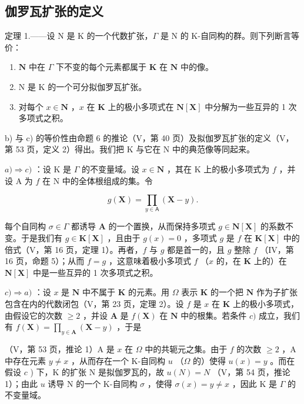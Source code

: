 \subsection{伽罗瓦扩张的定义}

定理 1.——设 N 是 K 的一个代数扩张，\(\Gamma\) 是 N 的 K-自同构的群。则下列断言等价：

\begin{enumerate}
\def\labelenumi{\alph{enumi})}
\item
  \(\mathbf{N}\) 中在 \(\Gamma\) 下不变的每个元素都属于 \(\mathbf{K}\) 在 \(\mathbf{N}\) 中的像。
\item
  N 是 K 的一个可分拟伽罗瓦扩张。
\item
  对每个 \(x \in \mathbf{N}\) ，\(x\) 在 \(\mathbf{K}\) 上的极小多项式在 \(\mathbf{N}[\mathbf{X}]\) 中分解为一些互异的 1 次多项式之积。
\end{enumerate}

b) 与 c) 的等价性由命题 6 的推论（V，第 40 页）及拟伽罗瓦扩张的定义（V，第 53 页，定义 2）得出。我们把 K 与它在 N 中的典范像等同起来。

\(a) \Rightarrow c)\) ：设 K 是 \(\Gamma\) 的不变量域。设 \(x \in \mathbf{N}\) ，其在 K 上的极小多项式为 \(f\) ，并设 A 为 \(f\) 在 N 中的全体根组成的集。令

\[
g (\mathbf {X}) = \prod_ {y \in \mathsf {A}} (\mathbf {X} - y).
\]

每个自同构 \(\sigma \in \Gamma\) 都诱导 \(\mathbf{A}\) 的一个置换，从而保持多项式 \(g \in \mathbf{N}[\mathbf{X}]\) 的系数不变。于是我们有 \(g \in \mathbf{K}[\mathbf{X}]\) ，且由于 \(g(x) = 0\) ，多项式 \(g\) 是 \(f\) 在 \(\mathbf{K}[\mathbf{X}]\) 中的倍式（V，第 16 页，定理 1）。再者，\(f\) 与 \(g\) 都是首一的，且 \(g\) 整除 \(f\) （IV，第 16 页，命题 5）；从而 \(f = g\) ，这意味着极小多项式 \(f\) （\(x\) 的，在 \(\mathbf{K}\) 上的）在 \(\mathbf{N}[\mathbf{X}]\) 中是一些互异的 1 次多项式之积。

\(c) \Rightarrow a)\) ：设 \(x\) 是 \(\mathbf{N}\) 中不属于 \(\mathbf{K}\) 的元素。用 \(\Omega\) 表示 \(\mathbf{K}\) 的一个把 \(\mathbf{N}\) 作为子扩张包含在内的代数闭包（V，第 23 页，定理 2）。设 \(f\) 是 \(x\) 在 \(\mathbf{K}\) 上的极小多项式，由假设它的次数 \(\geqslant 2\) ，并设 \(\mathbf{A}\) 是 \(f(\mathbf{X})\) 在 \(\mathbf{N}\) 中的根集。若条件 \(c)\) 成立，我们有 \(f(\mathbf{X}) = \prod_{y \in \mathbf{A}} (\mathbf{X} - y)\) ，于是

（V，第 53 页，推论 1）A 是 \(x\) 在 \(\Omega\) 中的共轭元之集。由于 \(f\) 的次数 \(\geqslant 2\) ，A 中存在元素 \(y \neq x\) ，从而存在一个 K-自同构 \(u\) （\(\Omega\) 的）使得 \(u(x) = y\) 。而在假设 \(c\) ) 下，K 的扩张 N 是拟伽罗瓦的，故 \(u(N) = N\) （V，第 54 页，推论 1）；由此 \(u\) 诱导 N 的一个 K-自同构 \(\sigma\) ，使得 \(\sigma(x) = y \neq x\) ，因此 K 是 \(\Gamma\) 的不变量域。

